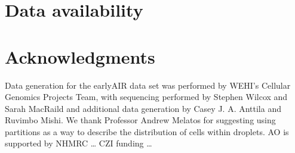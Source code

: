 \documentclass[unnumsec,webpdf,modern,large]{oup-authoring-template}
\begin{document}
	
	
	\section{Data availability}
	\label{sec:data availability}
	
	
	
	\section{Acknowledgments}
	\label{acknowledgements}
	
	Data generation for the earlyAIR data set was performed by WEHI’s Cellular Genomics Projects Team, with sequencing performed by Stephen Wilcox and Sarah MacRaild and additional data generation by Casey J. A. Anttila and Ruvimbo Mishi.
	We thank Professor Andrew Melatos for suggesting using partitions as a way to describe the distribution of cells within droplets. AO is supported by NHMRC … CZI funding …	
	
	
	 
	
	
	
	
	
\end{document}
